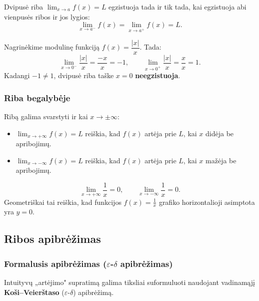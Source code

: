 \begin{theorem}
Dvipusė riba $\displaystyle\lim_{x \to a} f(x) = L$ egzistuoja tada ir tik tada, kai egzistuoja abi vienpusės ribos ir jos lygios:
\[
    \lim_{x \to a^-} f(x) = \lim_{x \to a^+} f(x) = L.
\]
\end{theorem}

\begin{example}
Nagrinėkime modulinę funkciją $f(x) = \dfrac{|x|}{x}$. Tada:
\[
    \lim_{x \to 0^-} \frac{|x|}{x} = \frac{-x}{x} = -1, \qquad
    \lim_{x \to 0^+} \frac{|x|}{x} = \frac{x}{x} = 1.
\]
Kadangi $-1 \neq 1$, dvipusė riba taške $x = 0$ \textbf{neegzistuoja}.
\end{example}

\subsubsection*{Riba begalybėje}

Ribą galima svarstyti ir kai $x \to \pm\infty$:

\begin{itemize}
    \item $\displaystyle\lim_{x \to +\infty} f(x) = L$ reiškia, kad $f(x)$ artėja prie $L$, kai $x$ didėja be apribojimų.
    \item $\displaystyle\lim_{x \to -\infty} f(x) = L$ reiškia, kad $f(x)$ artėja prie $L$, kai $x$ mažėja be apribojimų.
\end{itemize}

\begin{example}
\[
    \lim_{x \to +\infty} \frac{1}{x} = 0, \qquad
    \lim_{x \to -\infty} \frac{1}{x} = 0.
\]
Geometriškai tai reiškia, kad funkcijos $f(x) = \frac{1}{x}$ grafiko horizontalioji asimptota yra $y = 0$.
\end{example}

\subsection{Ribos apibrėžimas}

\subsubsection*{Formalusis apibrėžimas ($\varepsilon$-$\delta$ apibrėžimas)}

Intuityvų „artėjimo" supratimą galima tiksliai suformuluoti naudojant vadinamąjį \textbf{Koši–Veierštaso} ($\varepsilon$-$\delta$) apibrėžimą.

